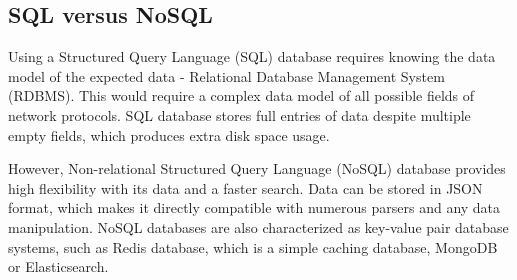 \documentclass[12pt,a4paper,twoside]{report}
\begin{document}
		\subsection{SQL versus NoSQL} \label{analysis:storage:sql}
			Using a Structured Query Language (SQL) database requires knowing the data model of the expected data - Relational Database Management System (RDBMS). This would require a complex data model of all possible fields of network protocols. SQL database stores full entries of data despite multiple empty fields, which produces extra disk space usage.\par
			However, Non-relational Structured Query Language (NoSQL) database provides high flexibility with its data and a faster search. Data can be stored in JSON format, which makes it directly compatible with numerous parsers and any data manipulation. NoSQL databases are also characterized as key-value pair database systems, such as Redis database, which is a simple caching database, MongoDB or Elasticsearch.
\end{document}
